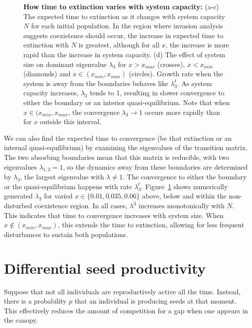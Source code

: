 \begin{figure}[th]
   \caption[How time to extinction varies with system capacity]{\textbf{How time to extinction varies with system capacity: }(a-c) The expected time to extinction as it changes with system capacity $N$ for each initial population. In the region where invasion analysis suggests coexistence should occur, the increase in expected time to extinction with $N$ is greatest, although for all $x$, the increase is more rapid than the increase in system capacity. (d) The effect of system size on dominant eigenvalue $\lambda_3$ for $x>x_{max}$ (crosses), $x<x_{min}$ (diamonds) and $x \in(x_{min},x_{max})$ (circles). Growth rate when the system is away from the boundaries behaves like $\lambda_3^t$. As system capacity increases, $\lambda_3$ tends to 1, resulting in slower convergence to either the boundary or an interior quasi-equilibrium. Note that when $x \in (x_{min},x_{max}$, the convergence $\lambda_3 \to 1$ occurs more rapidly than for $x$ outside this interval.}
 \label{fig:tte}
\end{figure}

We can also find the expected time to convergence (be that extinction or an internal quasi-equilibrium) by examining the eigenvalues of the transition matrix. The two absorbing boundaries mean that this matrix is reducible, with two eigenvalues $\lambda_{1,2}=1$, so the dynamics away from these boundaries are determined by $\lambda_3$, the largest eigenvalue with $\lambda \neq 1$. The convergence to either the boundary or the quasi-equilibrium happens with rate $\lambda_3^t$. Figure~\ref{fig:tte} shows numerically generated $\lambda_3$ for varied $x \in \{0.01,0.035,0.06\}$ above, below and within the non-disturbed coexistence region. In all cases, $\lambda^3$ increases monotonically with $N$. This indicates that time to convergence increases with system size. When $x \not\in (x_{min},x_{max})$, this extends the time to extinction, allowing for less frequent disturbances to sustain both populations.



 \section{Differential seed productivity}
\label{app2c}
Suppose that not all individuals are reproductively active all the time. Instead, there is a probability  $p$ that an individual is producing seeds at that moment. This effectively reduces the amount of competition for a gap when one appears in the canopy.

